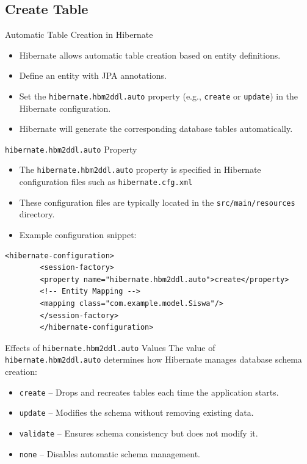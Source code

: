 \documentclass[aspectratio=169, table]{beamer}
\begin{document}
\subsection{Create Table}

\begin{frame}{Automatic Table Creation in Hibernate}
	\vspace{20pt}
	\begin{itemize}
		\item Hibernate allows automatic table creation based on entity definitions.
		\item Define an entity with JPA annotations.
		\item Set the \texttt{hibernate.hbm2ddl.auto} property (e.g., \texttt{create} or \texttt{update}) in the Hibernate configuration.
		\item Hibernate will generate the corresponding database tables automatically.
	\end{itemize}
\end{frame}

\begin{frame}[fragile]{\texttt{hibernate.hbm2ddl.auto} Property}
	\vspace{20pt}
	\begin{itemize}
		\item The \texttt{hibernate.hbm2ddl.auto} property is specified in Hibernate configuration files such as \texttt{hibernate.cfg.xml}
		\item These configuration files are typically located in the \texttt{src/main/resources} directory.
		\item Example configuration snippet:
	\end{itemize}
	
	\begin{lstlisting}[style=XmlStyle]
		<hibernate-configuration>
		<session-factory>
		<property name="hibernate.hbm2ddl.auto">create</property>
		<!-- Entity Mapping -->
		<mapping class="com.example.model.Siswa"/>
		</session-factory>
		</hibernate-configuration>
	\end{lstlisting}
\end{frame}


\begin{frame}{Effects of \texttt{hibernate.hbm2ddl.auto} Values}
	\vspace{20pt}
	The value of \texttt{hibernate.hbm2ddl.auto} determines how Hibernate manages database schema creation:
	\begin{itemize}
		\item \texttt{create} – Drops and recreates tables each time the application starts.
		\item \texttt{update} – Modifies the schema without removing existing data.
		\item \texttt{validate} – Ensures schema consistency but does not modify it.
		\item \texttt{none} – Disables automatic schema management.
	\end{itemize}
\end{frame}
\end{document}
